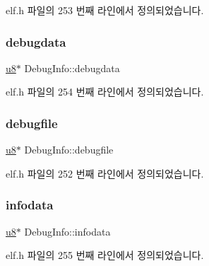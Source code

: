 elf.\+h 파일의 253 번째 라인에서 정의되었습니다.

\mbox{\label{struct_debug_info_a5ee56575f46d355b29ad0a28d61c3d8a}} 
\subsubsection{\texorpdfstring{debugdata}{debugdata}}
{\footnotesize\ttfamily \mbox{\hyperlink{_system_8h_aed742c436da53c1080638ce6ef7d13de}{u8}}$\ast$ Debug\+Info\+::debugdata}



elf.\+h 파일의 254 번째 라인에서 정의되었습니다.

\mbox{\label{struct_debug_info_aea82946966b8b7d1ef959ae9c923a919}} 
\subsubsection{\texorpdfstring{debugfile}{debugfile}}
{\footnotesize\ttfamily \mbox{\hyperlink{_system_8h_aed742c436da53c1080638ce6ef7d13de}{u8}}$\ast$ Debug\+Info\+::debugfile}



elf.\+h 파일의 252 번째 라인에서 정의되었습니다.

\mbox{\label{struct_debug_info_afa6aab954bee3f4e7070c8efa6cc569f}} 
\subsubsection{\texorpdfstring{infodata}{infodata}}
{\footnotesize\ttfamily \mbox{\hyperlink{_system_8h_aed742c436da53c1080638ce6ef7d13de}{u8}}$\ast$ Debug\+Info\+::infodata}



elf.\+h 파일의 255 번째 라인에서 정의되었습니다.

\mbox{\label{struct_debug_info_adcb1491b1a4434a104942115f82b820c}} 
